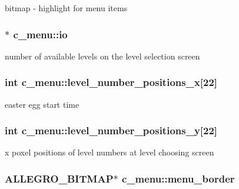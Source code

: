 bitmap -\/ highlight for menu items \hypertarget{classc__menu_ae21342c5213a9d1f75932af186f65327}{
\subsubsection[{io}]{$\ast$ c\-\_\-menu\-::io\hspace{0.3cm}{\ttfamily [protected]}}}\label{classc__menu_ae21342c5213a9d1f75932af186f65327}
number of available levels on the level selection screen \hypertarget{classc__menu_a39f79196e63fb1e14ac437c2d88c8c7d}{
\subsubsection[{level\-\_\-number\-\_\-positions\-\_\-x}]{\setlength{\rightskip}{0pt plus 5cm}int c\-\_\-menu\-::level\-\_\-number\-\_\-positions\-\_\-x\mbox{[}22\mbox{]}\hspace{0.3cm}{\ttfamily [protected]}}}\label{classc__menu_a39f79196e63fb1e14ac437c2d88c8c7d}
easter egg start time \hypertarget{classc__menu_ac4f208edba8bee1d6184db03e3a89e41}{
\subsubsection[{level\-\_\-number\-\_\-positions\-\_\-y}]{\setlength{\rightskip}{0pt plus 5cm}int c\-\_\-menu\-::level\-\_\-number\-\_\-positions\-\_\-y\mbox{[}22\mbox{]}\hspace{0.3cm}{\ttfamily [protected]}}}\label{classc__menu_ac4f208edba8bee1d6184db03e3a89e41}
x poxel positions of level numbers at level choosing screen \hypertarget{classc__menu_af61b3585bbce811355a9522f4d4e5ee1}{
\subsubsection[{menu\-\_\-border}]{\setlength{\rightskip}{0pt plus 5cm}A\-L\-L\-E\-G\-R\-O\-\_\-\-B\-I\-T\-M\-A\-P$\ast$ c\-\_\-menu\-::menu\-\_\-border\hspace{0.3cm}{\ttfamily [protected]}}}\label{classc__menu_af61b3585bbce811355a9522f4d4e5ee1}

